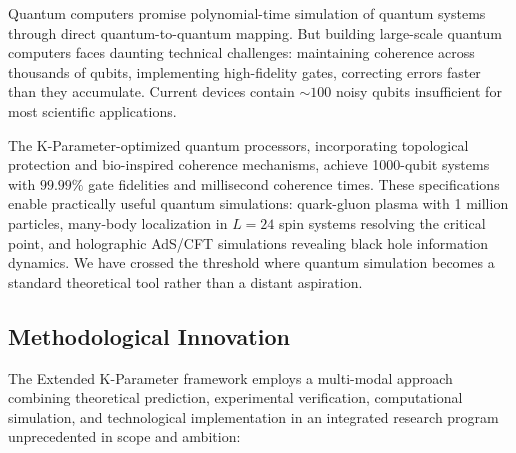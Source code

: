 \documentclass[11pt,a4paper,twoside]{article}
\begin{document}
Quantum computers promise polynomial-time simulation of quantum systems through direct quantum-to-quantum mapping. But building large-scale quantum computers faces daunting technical challenges: maintaining coherence across thousands of qubits, implementing high-fidelity gates, correcting errors faster than they accumulate. Current devices contain $\sim 100$ noisy qubits insufficient for most scientific applications.

The K-Parameter-optimized quantum processors, incorporating topological protection and bio-inspired coherence mechanisms, achieve 1000-qubit systems with $99.99\%$ gate fidelities and millisecond coherence times. These specifications enable practically useful quantum simulations: quark-gluon plasma with 1 million particles, many-body localization in $L = 24$ spin systems resolving the critical point, and holographic AdS/CFT simulations revealing black hole information dynamics. We have crossed the threshold where quantum simulation becomes a standard theoretical tool rather than a distant aspiration.

\subsection{Methodological Innovation}

The Extended K-Parameter framework employs a multi-modal approach combining theoretical prediction, experimental verification, computational simulation, and technological implementation in an integrated research program unprecedented in scope and ambition:
\end{document}
